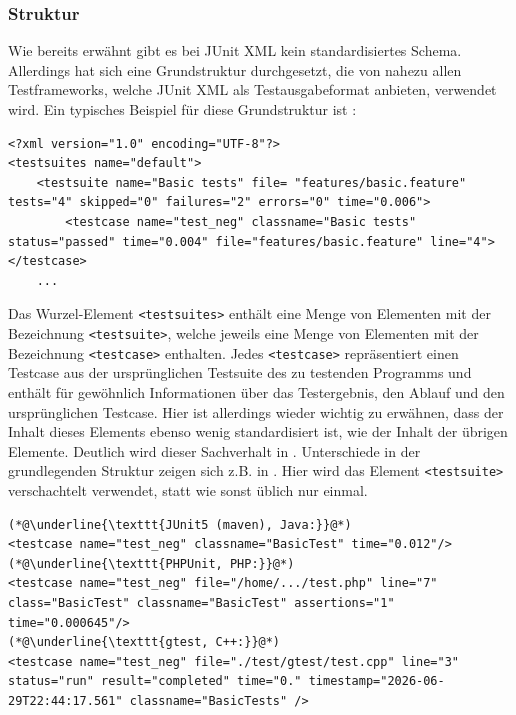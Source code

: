 \subsubsection{Struktur}\label{JUnit_struktur}
Wie bereits erwähnt gibt es bei JUnit XML kein standardisiertes Schema. Allerdings hat sich eine Grundstruktur durchgesetzt, die von nahezu allen Testframeworks, welche JUnit XML als Testausgabeformat anbieten, verwendet wird. Ein typisches Beispiel für diese Grundstruktur ist :
\begin{lstlisting}[caption={JUnit XML, erzeugt durch das PHP-Testframework behat.\\ ''\textellipsis{}'' bezeichnet gekürzte Stellen.}, label={JUNITbehat}]
<?xml version="1.0" encoding="UTF-8"?>
<testsuites name="default">
    <testsuite name="Basic tests" file= "features/basic.feature" tests="4" skipped="0" failures="2" errors="0" time="0.006">
        <testcase name="test_neg" classname="Basic tests" status="passed" time="0.004" file="features/basic.feature" line="4"></testcase>
    ...
\end{lstlisting}
Das Wurzel-Element \texttt{<testsuites>} enthält eine Menge von Elementen mit der Bezeichnung \texttt{<testsuite>}, welche jeweils eine Menge von Elementen mit der Bezeichnung \texttt{<testcase>} enthalten. Jedes \texttt{<testcase>} repräsentiert einen Testcase aus der ursprünglichen Testsuite des zu testenden Programms und enthält für gewöhnlich Informationen über das Testergebnis, den Ablauf und den ursprünglichen Testcase. Hier ist allerdings wieder wichtig zu erwähnen, dass der Inhalt dieses Elements ebenso wenig standardisiert ist, wie der Inhalt der übrigen Elemente. Deutlich wird dieser Sachverhalt in . Unterschiede in der grundlegenden Struktur zeigen sich z.B. in . Hier wird das Element \texttt{<testsuite>} verschachtelt verwendet, statt wie sonst üblich nur einmal.

\begin{lstlisting}[caption={direkter Vergleich verschiedener Implementierungen des <testcase>-tags in ausgewählten JUnit-XML Ausgaben. Verglichen wird jeweils die Ausgabe des fehlerlos ausgeführten Testcases \texttt{test\_neg}.\\ ''\textellipsis{}'' bezeichnet gekürzte Stellen.}, label={JUNITcompare}]
(*@\underline{\texttt{JUnit5 (maven), Java:}}@*)
<testcase name="test_neg" classname="BasicTest" time="0.012"/>
(*@\underline{\texttt{PHPUnit, PHP:}}@*)
<testcase name="test_neg" file="/home/.../test.php" line="7" class="BasicTest" classname="BasicTest" assertions="1" time="0.000645"/>
(*@\underline{\texttt{gtest, C++:}}@*)
<testcase name="test_neg" file="./test/gtest/test.cpp" line="3" status="run" result="completed" time="0." timestamp="2026-06-29T22:44:17.561" classname="BasicTests" />
\end{lstlisting}

